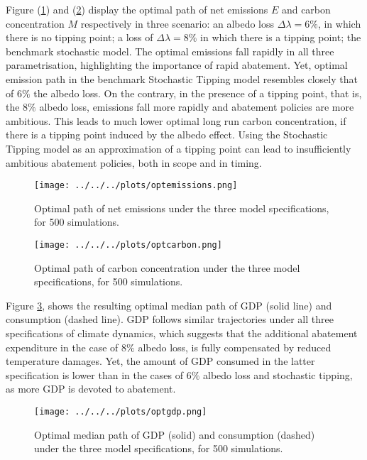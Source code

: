 \documentclass[../../main.tex]{subfiles}
\begin{document}
Figure (\ref{fig:optimal:emissions}) and (\ref{fig:optimal:carbon concentration}) display the optimal path of net emissions $E$ and carbon concentration $M$ respectively in three scenario: an albedo loss $\Delta\lambda = 6\%$, in which there is no tipping point; a loss of $\Delta\lambda = 8\%$ in which there is a tipping point; the benchmark stochastic model. The optimal emissions fall rapidly in all three parametrisation, highlighting the importance of rapid abatement. Yet, optimal emission path in the benchmark Stochastic Tipping model resembles closely that of $6\%$ the albedo loss. On the contrary, in the presence of a tipping point, that is, the $8\%$ albedo loss, emissions fall more rapidly and abatement policies are more ambitious. This leads to much lower optimal long run carbon concentration, if there is a tipping point induced by the albedo effect. Using the Stochastic Tipping model as an approximation of a tipping point can lead to insufficiently ambitious abatement policies, both in scope and in timing.

\begin{figure}[H]
    \centering
    \texttt{[image: ../../../plots/optemissions.png]}
    \caption{Optimal path of net emissions under the three model specifications, for 500 simulations.}
    \label{fig:optimal:emissions}
\end{figure}

\begin{figure}[H]
    \centering
    \texttt{[image: ../../../plots/optcarbon.png]}
    \caption{Optimal path of carbon concentration under the three model specifications, for 500 simulations.}
    \label{fig:optimal:carbon concentration}
\end{figure}

Figure \ref{fig:optimal:gdp}, shows the resulting optimal median path of GDP (solid line) and consumption (dashed line). GDP follows similar trajectories under all three specifications of climate dynamics, which suggests that the additional abatement expenditure in the case of $8\%$ albedo loss, is fully compensated by reduced temperature damages. Yet, the amount of GDP consumed in the latter specification is lower than in the cases of $6\%$ albedo loss and stochastic tipping, as more GDP is devoted to abatement.

\begin{figure}[H]
    \centering
    \texttt{[image: ../../../plots/optgdp.png]}
    \caption{Optimal median path of GDP (solid) and consumption (dashed) under the three model specifications, for 500 simulations.}
    \label{fig:optimal:gdp}
\end{figure}
\end{document}
